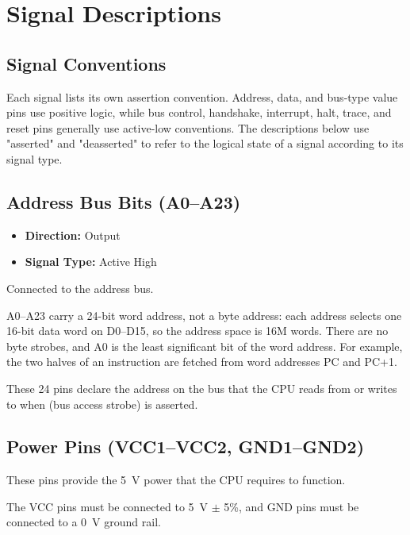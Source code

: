 \chapter{Signal Descriptions}
\label{ch:signal-descriptions}

\section{Signal Conventions}

Each signal lists its own assertion convention. Address, data, and bus-type value pins use positive logic, while bus
control, handshake, interrupt, halt, trace, and reset pins generally use active-low conventions. The descriptions below
use "asserted" and "deasserted" to refer to the logical state of a signal according to its signal type.

\section{Address Bus Bits (A0--A23)}

\begin{itemize}
	\item \textbf{Direction:} Output
	\item \textbf{Signal Type:} Active High
\end{itemize}

Connected to the address bus.

A0--A23 carry a 24-bit word address, not a byte address: each address selects one 16-bit data word on D0--D15, so the
address space is 16M words. There are no byte strobes, and A0 is the least significant bit of the word address. For
example, the two halves of an instruction are fetched from word addresses PC and PC+1.

These 24 pins declare the address on the bus that the CPU reads from or writes to when  (bus access
strobe) is asserted.

\section{Power Pins (VCC1--VCC2, GND1--GND2)}

These pins provide the 5~V power that the CPU requires to function.

The VCC pins must be connected to 5~V $\pm$ 5\%, and GND pins must be connected to a 0~V ground rail.


